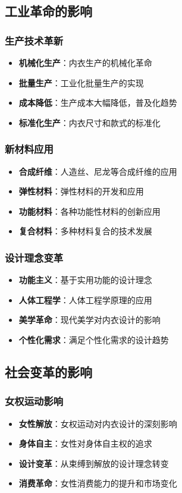 \documentclass[12pt,UTF8]{ctexbook}
\begin{document}
\subsection{工业革命的影响}
\subsubsection{生产技术革新}
\begin{itemize}[leftmargin=2cm]
	\item \textbf{机械化生产}：内衣生产的机械化革命
	\item \textbf{批量生产}：工业化批量生产的实现
	\item \textbf{成本降低}：生产成本大幅降低，普及化趋势
	\item \textbf{标准化生产}：内衣尺寸和款式的标准化
\end{itemize}

\subsubsection{新材料应用}
\begin{itemize}[leftmargin=2cm]
	\item \textbf{合成纤维}：人造丝、尼龙等合成纤维的应用
	\item \textbf{弹性材料}：弹性材料的开发和应用
	\item \textbf{功能材料}：各种功能性材料的创新应用
	\item \textbf{复合材料}：多种材料复合的技术发展
\end{itemize}

\subsubsection{设计理念变革}
\begin{itemize}[leftmargin=2cm]
	\item \textbf{功能主义}：基于实用功能的设计理念
	\item \textbf{人体工程学}：人体工程学原理的应用
	\item \textbf{美学革命}：现代美学对内衣设计的影响
	\item \textbf{个性化需求}：满足个性化需求的设计趋势
\end{itemize}

\subsection{社会变革的影响}
\subsubsection{女权运动影响}
\begin{itemize}[leftmargin=2cm]
	\item \textbf{女性解放}：女权运动对内衣设计的深刻影响
	\item \textbf{身体自主}：女性对身体自主权的追求
	\item \textbf{设计变革}：从束缚到解放的设计理念转变
	\item \textbf{消费革命}：女性消费能力的提升和市场变化
\end{itemize}
\end{document}
